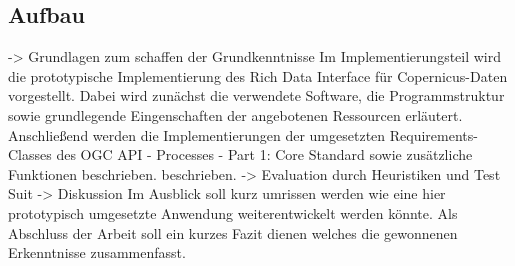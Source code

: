 \subsection{Aufbau} 
-> Grundlagen zum schaffen der Grundkenntnisse
Im Implementierungsteil wird die prototypische Implementierung des Rich Data Interface für Copernicus-Daten vorgestellt. Dabei wird zunächst die verwendete Software, die Programmstruktur sowie 
grundlegende Eingenschaften der angebotenen Ressourcen erläutert. Anschließend werden die Implementierungen der umgesetzten Requirements-Classes des OGC API - Processes - Part 1: Core Standard 
sowie zusätzliche Funktionen beschrieben.
beschrieben. 
-> Evaluation durch Heuristiken und Test Suit 
-> Diskussion
Im Ausblick soll kurz umrissen werden wie eine hier prototypisch umgesetzte Anwendung weiterentwickelt werden könnte. 
Als Abschluss der Arbeit soll ein kurzes Fazit dienen welches die gewonnenen Erkenntnisse zusammenfasst. 


